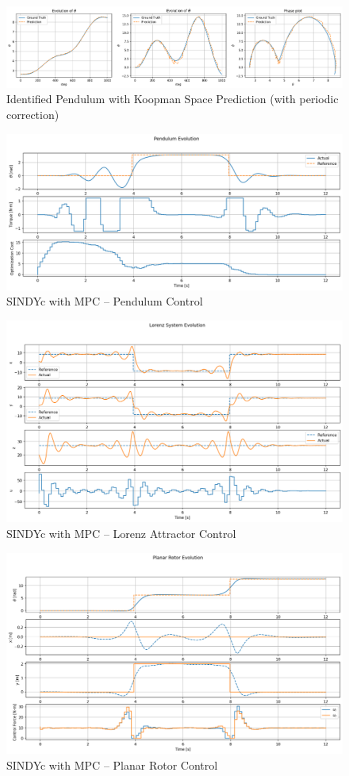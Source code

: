 \documentclass[10pt,twocolumn]{article}
\begin{document}
\begin{figure}[htb!]
  \centering
  \includegraphics[width=\textwidth]{koopman_correct}
  \caption{Identified Pendulum with Koopman Space Prediction (with periodic correction)}
  \label{fig:koopman_correct}
\end{figure}

\begin{figure}[htb!]
  \centering
  \includegraphics[width=\textwidth]{mpc_pendulum}
  \caption{SINDYc with MPC -- Pendulum Control}
  \label{fig:mpc_pendulum}
\end{figure}

\begin{figure}[htb!]
  \centering
  \includegraphics[width=\textwidth]{mpc_lorenz}
  \caption{SINDYc with MPC -- Lorenz Attractor Control}
  \label{fig:mpc_lorenz}
\end{figure}

\begin{figure}[htb!]
  \centering
  \includegraphics[width=\textwidth]{mpc_rotor}
  \caption{SINDYc with MPC -- Planar Rotor Control}
  \label{fig:mpc_rotor}
\end{figure}
\end{document}
